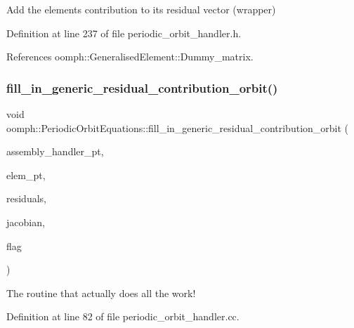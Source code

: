 Add the element\textquotesingle{}s contribution to its residual vector (wrapper) 



Definition at line 237 of file periodic\+\_\+orbit\+\_\+handler.\+h.



References oomph\+::\+Generalised\+Element\+::\+Dummy\+\_\+matrix.

\mbox{\label{classoomph_1_1PeriodicOrbitEquations_a8601a20947d15aa0c1f55ee0b654b71f}} 
\subsubsection{\texorpdfstring{fill\+\_\+in\+\_\+generic\+\_\+residual\+\_\+contribution\+\_\+orbit()}{fill\_in\_generic\_residual\_contribution\_orbit()}}
{\footnotesize\ttfamily void oomph\+::\+Periodic\+Orbit\+Equations\+::fill\+\_\+in\+\_\+generic\+\_\+residual\+\_\+contribution\+\_\+orbit (\begin{DoxyParamCaption}\item[{\hyperlink{classoomph_1_1PeriodicOrbitAssemblyHandlerBase}{Periodic\+Orbit\+Assembly\+Handler\+Base} $\ast$const \&}]{assembly\+\_\+handler\+\_\+pt,  }\item[{\hyperlink{classoomph_1_1GeneralisedElement}{Generalised\+Element} $\ast$const \&}]{elem\+\_\+pt,  }\item[{\hyperlink{classoomph_1_1Vector}{Vector}$<$ double $>$ \&}]{residuals,  }\item[{\hyperlink{classoomph_1_1DenseMatrix}{Dense\+Matrix}$<$ double $>$ \&}]{jacobian,  }\item[{const unsigned \&}]{flag }\end{DoxyParamCaption})\hspace{0.3cm}{\ttfamily [protected]}}



The routine that actually does all the work! 



Definition at line 82 of file periodic\+\_\+orbit\+\_\+handler.\+cc.



